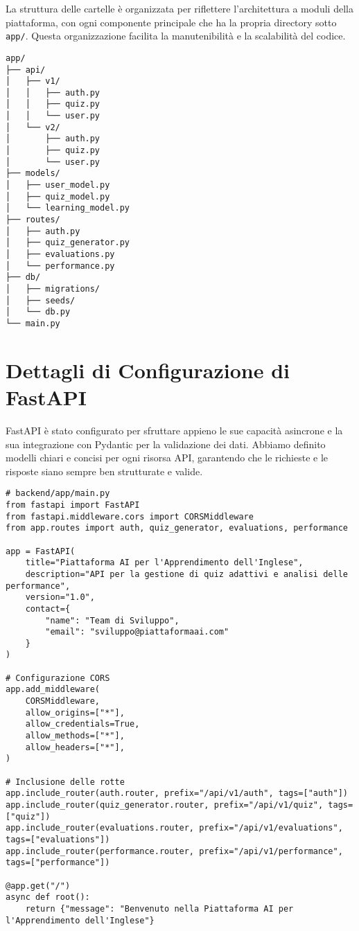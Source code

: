 \documentclass[a4paper, 14pt, oneside]{extbook}
\begin{document}
La struttura delle cartelle è organizzata per riflettere l'architettura a moduli della piattaforma, con ogni componente principale che ha la propria directory sotto \texttt{app/}. Questa organizzazione facilita la manutenibilità e la scalabilità del codice.

\begin{verbatim}
app/
├── api/
│   ├── v1/
│   │   ├── auth.py
│   │   ├── quiz.py
│   │   └── user.py
│   └── v2/
│       ├── auth.py
│       ├── quiz.py
│       └── user.py
├── models/
│   ├── user_model.py
│   ├── quiz_model.py
│   └── learning_model.py
├── routes/
│   ├── auth.py
│   ├── quiz_generator.py
│   ├── evaluations.py
│   └── performance.py
├── db/
│   ├── migrations/
│   ├── seeds/
│   └── db.py
└── main.py
\end{verbatim}

\section{Dettagli di Configurazione di FastAPI}

FastAPI è stato configurato per sfruttare appieno le sue capacità asincrone e la sua integrazione con Pydantic per la validazione dei dati. Abbiamo definito modelli chiari e concisi per ogni risorsa API, garantendo che le richieste e le risposte siano sempre ben strutturate e valide.

\begin{lstlisting}[style=pythonstyle, caption=Configurazione di FastAPI, label=lst:fastapi-config]
# backend/app/main.py
from fastapi import FastAPI
from fastapi.middleware.cors import CORSMiddleware
from app.routes import auth, quiz_generator, evaluations, performance

app = FastAPI(
    title="Piattaforma AI per l'Apprendimento dell'Inglese",
    description="API per la gestione di quiz adattivi e analisi delle performance",
    version="1.0",
    contact={
        "name": "Team di Sviluppo",
        "email": "sviluppo@piattaformaai.com"
    }
)

# Configurazione CORS
app.add_middleware(
    CORSMiddleware,
    allow_origins=["*"],
    allow_credentials=True,
    allow_methods=["*"],
    allow_headers=["*"],
)

# Inclusione delle rotte
app.include_router(auth.router, prefix="/api/v1/auth", tags=["auth"])
app.include_router(quiz_generator.router, prefix="/api/v1/quiz", tags=["quiz"])
app.include_router(evaluations.router, prefix="/api/v1/evaluations", tags=["evaluations"])
app.include_router(performance.router, prefix="/api/v1/performance", tags=["performance"])

@app.get("/")
async def root():
    return {"message": "Benvenuto nella Piattaforma AI per l'Apprendimento dell'Inglese"}
\end{lstlisting}
\end{document}
